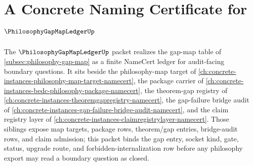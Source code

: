 \chapter{A Concrete Naming Certificate for $\PhilosophyGapMapLedgerUp$}
\label{ch:concrete-instances-philosophy-gap-map-ledger-namecert}

The $\PhilosophyGapMapLedgerUp$ packet realizes the gap-map table of \autoref{subsec:philosophy-gap-map} as a finite NameCert ledger for audit-facing boundary questions. It sits beside the philosophy-map target of \autoref{ch:concrete-instances-philosophy-map-target-namecert}, the package carrier of \autoref{ch:concrete-instances-bedc-philosophy-package-namecert}, the theorem-gap registry of \autoref{ch:concrete-instances-theoremgapregistry-namecert}, the gap-failure bridge audit of \autoref{ch:concrete-instances-gap-failure-bridge-audit-namecert}, and the claim registry layer of \autoref{ch:concrete-instances-claimregistrylayer-namecert}. Those siblings expose map targets, package rows, theorem/gap entries, bridge-audit rows, and claim admission; this packet binds the gap entry, socket kind, gate, status, upgrade route, and forbidden-internalization row before any philosophy export may read a boundary question as closed.

